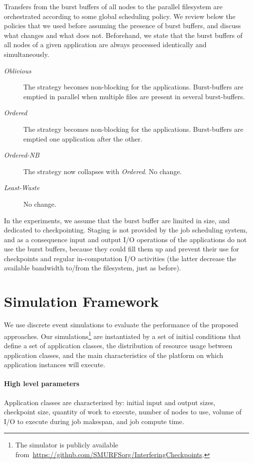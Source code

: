 \documentclass[two]{article}
\newcommand{\nocoop}{\emph{Oblivious}\xspace}
\newcommand{\fifoblock}{\emph{Ordered}\xspace}
\newcommand{\fifononblock}{\emph{Ordered-NB}\xspace}
\newcommand{\leastwaste}{\emph{Least-Waste}\xspace}
\begin{document}
Transfers from the burst buffers of all nodes to the parallel
filesystem are orchestrated according to some global scheduling
policy. We review below the policies that we used before assuming the
presence of burst buffers, and discuss what changes and what does
not. Beforehand, we state that the burst buffers of all nodes of a
given application are always processed identically and simultaneously.

\begin{description}

\item[\nocoop] The strategy becomes non-blocking for the applications. Burst-buffers are emptied in parallel
when multiple files are present in several burst-buffers.
\item[\fifoblock]  The strategy becomes non-blocking for the applications. Burst-buffers are emptied one application after the other.
\item[\fifononblock] The strategy now collapses with \fifoblock. No change.
\item[\leastwaste] No change.
\end{description}

In the experiments, we assume that the burst buffer are limited in
size, and dedicated to checkpointing. Staging is not provided by the
job scheduling system, and as a consequence input and output I/O
operations of the applications do not use the burst buffers, because
they could fill them up and prevent their use for checkpoints and
regular in-computation I/O activities (the latter decrease the
available bandwidth to/from the filesystem, just as before).

\section{Simulation Framework}
\label{sec:simulator}

We use discrete event simulations to evaluate the performance of the proposed
approaches.  Our simulations\footnote{The simulator is publicly available
from~\url{https://github.com/SMURFSorg/InterferingCheckpoints}.} are instantiated
by a set of initial conditions that define a set of application classes, the
distribution of resource usage between application classes, and the main
characteristics of the platform on which application instances will execute.

\paragraph*{High level parameters}
Application classes are characterized by: initial input and output sizes, checkpoint
size, quantity of work to execute, number of nodes to use, volume of I/O to
execute during job makespan, and job compute time.
\end{document}
